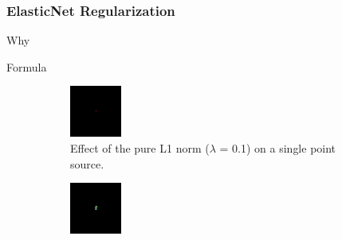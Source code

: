\subsubsection{ElasticNet Regularization}
Why


Formula

\begin{figure}[h]
	\centering
	\begin{subfigure}[b]{0.3\linewidth}
		\includegraphics[width=\linewidth]{./chapters/03.distribution/L1.png}
		\caption{Effect of the pure L1 norm ($\lambda$ = 0.1) on a single point source.}
		\label{dist:cd:elastic:L1}
	\end{subfigure}
	\begin{subfigure}[b]{0.3\linewidth}
		\includegraphics[width=\linewidth]{./chapters/03.distribution/L2.png}

\end{subfigure}
\end{figure}
